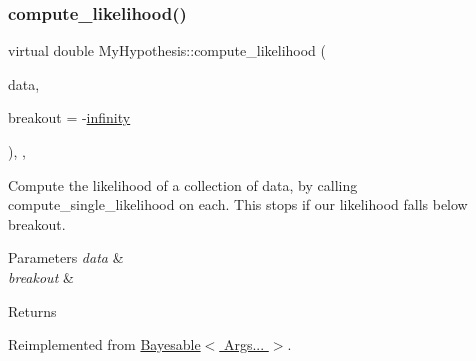 \mbox{\label{class_my_hypothesis_ad5cd40d67c9b6fb61311a5f4a08df426}} 
\subsubsection{\texorpdfstring{compute\+\_\+likelihood()}{compute\_likelihood()}\hspace{0.1cm}{\footnotesize\ttfamily [1/2]}}
{\footnotesize\ttfamily virtual double My\+Hypothesis\+::compute\+\_\+likelihood (\begin{DoxyParamCaption}\item[{const \hyperlink{class_bayesable_aa2788c4d7718c0a824e1d28c4c98f921}{data\+\_\+t} \&}]{data,  }\item[{const double}]{breakout = {\ttfamily -\/\hyperlink{_numerics_8h_a1bb1e42ae1b40cad6e99da0aab8a5576}{infinity}} }\end{DoxyParamCaption})\hspace{0.3cm}{\ttfamily [inline]}, {\ttfamily [override]}, {\ttfamily [virtual]}}



Compute the likelihood of a collection of data, by calling compute\+\_\+single\+\_\+likelihood on each. This stops if our likelihood falls below breakout. 


\begin{DoxyParams}{Parameters}
{\em data} & \\
\hline
{\em breakout} & \\
\hline
\end{DoxyParams}
\begin{DoxyReturn}{Returns}

\end{DoxyReturn}


Reimplemented from \hyperlink{class_bayesable_a202493156cec15937bee304d807fdbdb}{Bayesable$<$ Args... $>$}.

\mbox{\label{class_my_hypothesis_a42d7d139cd23f30342e1393fd0873dd1}} 
